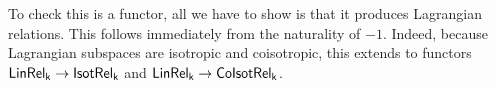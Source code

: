 \begin{lemma}
\end{lemma}
To check this is a functor, all we have to show is that it produces Lagrangian relations. This follows immediately from the naturality of $-1$.
Indeed, because Lagrangian subspaces are isotropic and coisotropic, this extends to functors $\sf LinRel_k\to{\sf Isot}\mathsf{Rel}_k$ and $\sf LinRel_k\to{\sf Co}{\sf Isot}\mathsf{Rel}_k$.

